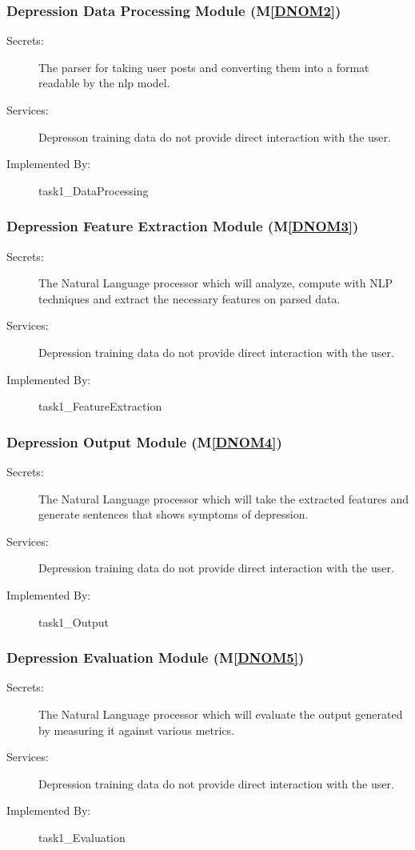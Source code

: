 \documentclass[12pt, titlepage]{article}
\newcommand{\mref}[1]{M\ref{#1}}
\begin{document}
\subsubsection{Depression Data Processing Module (\mref{DNOM2})}
\begin{description}
\item[Secrets:]The parser for taking user posts and converting them into a format readable by the nlp model.
\item[Services:] Depresson training data do not provide direct interaction with the user. 
\item[Implemented By:] task1\_DataProcessing
\end{description}

\subsubsection{Depression Feature Extraction Module (\mref{DNOM3})}
\begin{description}
\item[Secrets:]The Natural Language processor which will analyze, compute with NLP techniques and extract the necessary features on parsed data.
\item[Services:] Depression training data do not provide direct interaction with the user. 
\item[Implemented By:] task1\_FeatureExtraction
\end{description}

\subsubsection{Depression Output Module (\mref{DNOM4})}
\begin{description}
\item[Secrets:]The Natural Language processor which will take the extracted features and generate sentences that shows symptoms of depression.
\item[Services:] Depression training data do not provide direct interaction with the user. 
\item[Implemented By:] task1\_Output
\end{description}

\subsubsection{Depression Evaluation Module (\mref{DNOM5})}
\begin{description}
\item[Secrets:]The Natural Language processor which will evaluate the output generated by measuring it against various metrics.
\item[Services:] Depression training data do not provide direct interaction with the user. 
\item[Implemented By:] task1\_Evaluation
\end{description}
\end{document}
